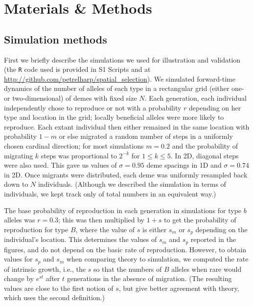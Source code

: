 \documentclass[10pt,letterpaper]{article}
\begin{document}
\section*{Materials \& Methods}

\subsection*{Simulation methods}
\label{ss:simulations}

First we briefly describe the simulations we used for illustration and validation
(the \texttt{R} code used is provided in S1 Scripts and at \url{http://github.com/petrelharp/spatial_selection}).
We simulated forward-time dynamics of the number of alleles of each type in a rectangular grid (either one- or two-dimensional) of demes with fixed size $N$.
Each generation, each individual independently chose to reproduce or not with a probability $r$ depending on her type and location in the grid;
locally beneficial alleles were more likely to reproduce.
Each extant individual then either remained in the same location with probability $1-m$
or else migrated a random number of steps 
in a uniformly chosen cardinal direction; 
for most simulations $m=0.2$ and
the probability of migrating $k$ steps was proportional to $2^{-k}$ for $1\le k \le 5$.
In 2D, diagonal steps were also used.
This gave us values of $\sigma=0.95$ deme spacings in 1D
and $\sigma=0.74$ in 2D.
Once migrants were distributed, each deme was uniformly resampled back down to $N$ individuals.
(Although we described the simulation in terms of individuals,
we kept track only of total numbers in an equivalent way.)

The base probability of reproduction in each generation in simulations for type $b$ alleles was $r=0.3$;
this was then multiplied by $1+s$ to get the probability of reproduction for type $B$,
where the value of $s$ is either $s_m$ or $s_p$ depending on the individual's location.
This determines the values of $s_m$ and $s_p$ reported in the figures, 
and do not depend on the basic rate of reproduction.
However, to obtain values for $s_p$ and $s_m$ when comparing theory to simulation,
we computed the rate of intrinsic growth, 
i.e., the $s$ so that the numbers of $B$ alleles when rare would change by $e^{st}$ after $t$ generations
in the absence of migration.
(The resulting values are close to the first notion of $s$,
but give better agreement with theory,
which uses the second definition.)
\end{document}
